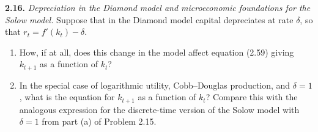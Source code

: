 \noindent\textbf{2.16.} \emph{Depreciation in the Diamond model and microeconomic foundations for the Solow model.} Suppose that in the Diamond model capital depreciates at rate $\delta$, so that $r_t=f'(k_t)-\delta$.
\begin{enumerate}[label=(\alph*),leftmargin=2.2em,topsep=2pt,itemsep=1pt]
\item How, if at all, does this change in the model affect equation (2.59) giving $k_{t+1}$ as a function of $k_t$?
\item In the special case of logarithmic utility, Cobb--Douglas production, and $\delta=1$, what is the equation for $k_{t+1}$ as a
function of $k_t$? Compare this with the analogous expression for the discrete-time version of the Solow model with $\delta=1$ from
part (a) of Problem 2.15.
\end{enumerate}

